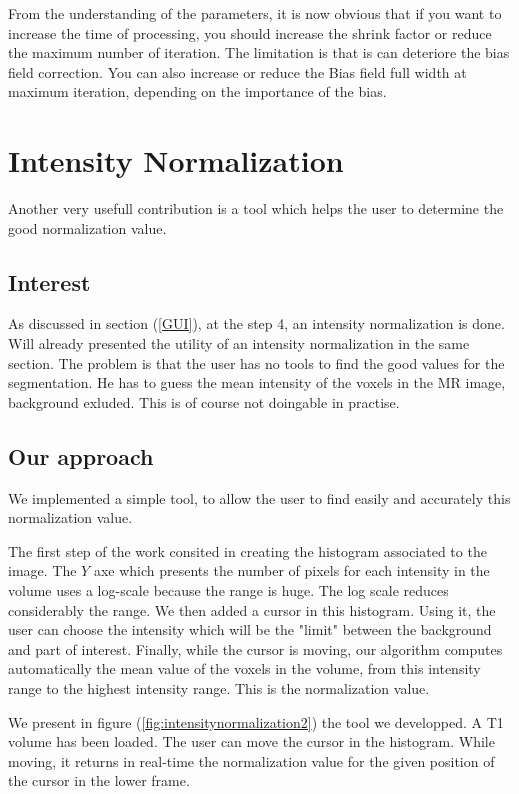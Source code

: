 \par
From the understanding of the parameters, it is now obvious that if you want to increase the time of processing, you should increase the shrink factor or reduce the maximum number of iteration. The limitation is that is can deteriore the bias field correction. You can also increase or reduce the Bias field full width at maximum iteration, depending on the importance of the bias.
%


\section{Intensity Normalization}\label{intensitynormalizationddd}
Another very usefull contribution is a tool which helps the user to determine the good normalization value.
\subsection{Interest}
As discussed in section (\ref{GUI}), at the step 4, an intensity normalization is done. Will already presented the utility of an intensity normalization in the same section. The problem is that the user has no tools to find the good values for the segmentation. He has to guess the mean intensity of the voxels in the MR image, background exluded. This is of course not doingable in practise.
\subsection{Our approach}
We implemented a simple tool, to allow the user to find easily and accurately this normalization value.
\par
The first step of the work consited in creating the histogram associated to the image. The $Y$ axe which presents the number of pixels for each intensity in the volume uses a log-scale because the range is huge. The log scale reduces considerably the range. We then added a cursor in this histogram. Using it, the user can choose the intensity which will be the "limit" between the background and part of interest. Finally, while the cursor is moving, our algorithm computes automatically the mean value of the voxels in the volume, from this intensity range to the highest intensity range. This is the normalization value.
\par
We present in figure (\ref{fig:intensitynormalization2}) the tool we developped. A T1 volume has been loaded. The user can move the cursor in the histogram. While moving, it returns in real-time the normalization value for the given position of the cursor in the lower frame.

